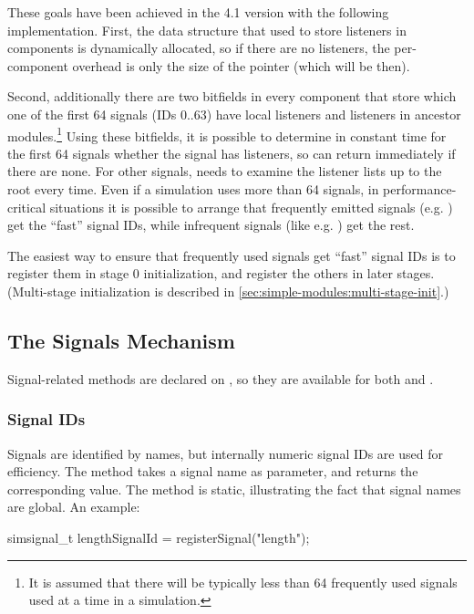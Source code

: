 These goals have been achieved in the 4.1 version with the following
implementation. First, the data structure that used to store listeners in
components is dynamically allocated, so if there are no listeners, the
per-component overhead is only the size of the pointer (which will be
 then).

Second, additionally there are two bitfields in every component that store
which one of the first 64 signals (IDs 0..63) have local listeners and
listeners in ancestor modules.\footnote{It is assumed that there will be
typically less than 64 frequently used signals used at a time in a
simulation.} Using these bitfields, it is possible to determine in constant
time for the first 64 signals whether the signal has listeners, so
 can return immediately if there are none. For other signals,
 needs to examine the listener lists up to the root every
time. Even if a simulation uses more than 64 signals, in
performance-critical situations it is possible to arrange that frequently
emitted signals (e.g. ) get the ``fast'' signal IDs, while
infrequent signals (like e.g. ) get the rest.

The easiest way to ensure that frequently used signals get ``fast'' signal IDs
is to register them in stage 0 initialization, and register the others
in later stages. (Multi-stage initialization is described in
\ref{sec:simple-modules:multi-stage-init}.)


\subsection{The Signals Mechanism}
\label{sec:simple-modules:signals-api}

Signal-related methods are declared on , so they are available
for both  and .

\subsubsection{Signal IDs}

Signals are identified by names, but internally numeric signal IDs are used
for efficiency. The  method takes a signal name as
parameter, and returns the corresponding  value.
The method is static, illustrating the fact that signal names are global.
An example:

\begin{cpp}
simsignal_t lengthSignalId = registerSignal("length");
\end{cpp}

